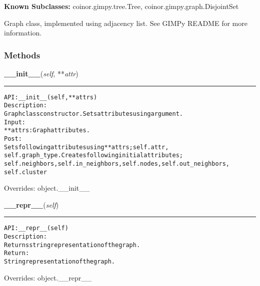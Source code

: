 \textbf{Known Subclasses:}
coinor.gimpy.tree.Tree,
    coinor.gimpy.graph.DisjointSet

Graph class, implemented using adjacency list. See GIMPy README for more 
information.



  \subsubsection{Methods}

    \vspace{0.5ex}

\hspace{.8\funcindent}\begin{boxedminipage}{\funcwidth}

    \raggedright \textbf{\_\_init\_\_}(\textit{self}, **\textit{attr})

    \vspace{-1.5ex}

    \rule{\textwidth}{0.5\fboxrule}
\setlength{\parskip}{2ex}
\begin{alltt}

API: \_\_init\_\_(self, **attrs)
Description:
Graph class constructor. Sets attributes using argument.
Input:
    **attrs: Graph attributes.
Post:
    Sets following attributes using **attrs; self.attr,
    self.graph\_type. Creates following initial attributes;
    self.neighbors, self.in\_neighbors, self.nodes, self.out\_neighbors,
    self.cluster
\end{alltt}

\setlength{\parskip}{1ex}
      Overrides: object.\_\_init\_\_

    \end{boxedminipage}

    \vspace{0.5ex}

\hspace{.8\funcindent}\begin{boxedminipage}{\funcwidth}

    \raggedright \textbf{\_\_repr\_\_}(\textit{self})

    \vspace{-1.5ex}

    \rule{\textwidth}{0.5\fboxrule}
\setlength{\parskip}{2ex}
\begin{alltt}

API: \_\_repr\_\_(self)
Description:
Returns string representation of the graph.
Return:
    String representation of the graph.
\end{alltt}

\setlength{\parskip}{1ex}
      Overrides: object.\_\_repr\_\_

    \end{boxedminipage}

